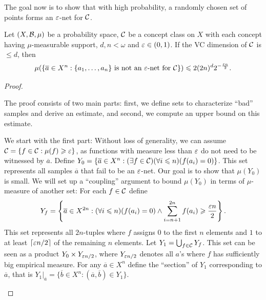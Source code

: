 The goal now is to show that with high probability, a randomly chosen set of points forms an $\varepsilon$-net for $\mathcal{C}$. 

\begin{theorem}
\label{thm:VCtheorem}
    Let $(X,\mathcal{B},\mu)$ be a probability space, $\mathcal{C}$ be a concept class on $X$ with each concept having $\mu$-measurable support, $d,n<\omega$ and $\varepsilon\in(0,1)$. 
    If the VC dimension of $\mathcal{C}$ is $\leq d$, then 
    $$\mu(\{ \overline{a} \in X^n : \{a_1, \ldots, a_n\} \text{ is not an $\varepsilon$-net for } \mathcal{C} \}) \leqslant 2(2n)^d 2^{-\frac{\varepsilon n}{2}}.$$
\end{theorem}

\begin{proof}
\begin{outline}
\0 The proof consists of two main parts: first, we define sets to characterize \enquote{bad} samples and derive an estimate, and second, we compute an upper bound on this estimate.\par
We start with the first part:
    \1 Without loss of generality, we can assume $\mathcal{C} = \{f\in \mathcal{C} : \mu(f) \geqslant \varepsilon\}$, as functions with measure less than $\varepsilon$ do not need to be witnessed by $\overline{a}$.
    \1 Define $Y_0 = \{\overline{a}\in X^n : (\exists f \in \mathcal{C})(\forall i \leqslant n) (f(a_i)=0)\}$. This set represents all samples $\overline{a}$ that fail to be an $\varepsilon$-net. Our goal is to show that $\mu(Y_0)$ is small.
\0 We will set up a \enquote{coupling} argument to bound $\mu(Y_0)$ in terms of $\mu$-measure of another set:
    \1 For each $f\in \mathcal{C}$ define
    $$Y_f= \left\{
    \overline{a} \in X^{2n} : (\forall i \leqslant n) (f(a_i)=0) \land \sum^{2n}_{i=n+1} f(a_i)\geqslant \frac{\varepsilon n}{2}
    \right\}.$$
    This set represents all $2n$-tuples where $f$ assigns $0$ to the first $n$ elements and $1$ to at least $\lceil\varepsilon n / 2\rceil$ of the remaining $n$ elements. 
    \1 Let $Y_1 = \bigcup_{f\in\mathcal{C}} Y_f$. This set can be seen as a product $Y_0 \times Y_{\varepsilon n /2}$, where $Y_{\varepsilon n/2}$ denotes all $a$'s where $f$ has sufficiently big empirical measure.
    \1 For any $\overline{a}\in X^n$ define the \enquote{section} of $Y_1$ corresponding to $\overline{a}$, that is $Y_1|_{\overline{a}} = \{\overline{b}\in X^n: (\overline{a}, \overline{b})\in Y_1\}$.

\end{outline}
\end{proof}

